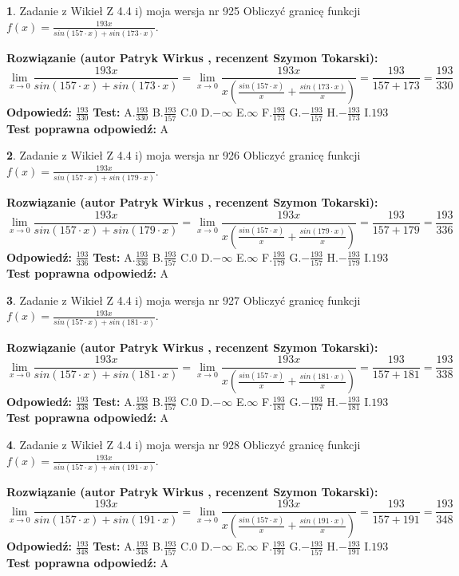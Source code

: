 \documentclass[12pt, a4paper]{article}
\theoremstyle{definition} %
\newtheorem{zad}{}
\newcommand{\zadStart}[1]{\begin{zad}#1\newline}
\newcommand{\zadStop}{\end{zad}}
\newcommand{\rozwStart}[2]{\noindent \textbf{Rozwiązanie (autor #1 , recenzent #2): }\newline}
\newcommand{\rozwStop}{\newline}
\newcommand{\odpStart}{\noindent \textbf{Odpowiedź:}\newline}
\newcommand{\odpStop}{\newline}
\newcommand{\testStart}{\noindent \textbf{Test:}\newline}
\newcommand{\testStop}{\newline}
\newcommand{\kluczStart}{\noindent \textbf{Test poprawna odpowiedź:}\newline}
\newcommand{\kluczStop}{\newline}
\begin{document}
\zadStart{Zadanie z Wikieł Z 4.4 i) moja wersja nr 925}
Obliczyć granicę funkcji $f(x)=\frac{193x}{sin(157\cdot x) +sin(173\cdot x)}$.
\zadStop
\rozwStart{Patryk Wirkus}{Szymon Tokarski}
$$\lim\limits_{x\to 0}\frac{193x}{sin(157\cdot x) +sin(173\cdot x)}=\lim\limits_{x\to 0}\frac{193x}{x(\frac{sin(157\cdot x)}{x}+\frac{sin(173\cdot x)}{x})}=\frac{193}{157+173} = \frac{193}{330}$$
\rozwStop
\odpStart
$\frac{193}{330}$
\odpStop
\testStart
A.$\frac{193}{330}$
B.$\frac{193}{157}$
C.$0$
D.$-\infty$
E.$\infty$
F.$\frac{193}{173}$
G.$-\frac{193}{157}$
H.$-\frac{193}{173}$
I.$193$
\testStop
\kluczStart
A
\kluczStop



\zadStart{Zadanie z Wikieł Z 4.4 i) moja wersja nr 926}
Obliczyć granicę funkcji $f(x)=\frac{193x}{sin(157\cdot x) +sin(179\cdot x)}$.
\zadStop
\rozwStart{Patryk Wirkus}{Szymon Tokarski}
$$\lim\limits_{x\to 0}\frac{193x}{sin(157\cdot x) +sin(179\cdot x)}=\lim\limits_{x\to 0}\frac{193x}{x(\frac{sin(157\cdot x)}{x}+\frac{sin(179\cdot x)}{x})}=\frac{193}{157+179} = \frac{193}{336}$$
\rozwStop
\odpStart
$\frac{193}{336}$
\odpStop
\testStart
A.$\frac{193}{336}$
B.$\frac{193}{157}$
C.$0$
D.$-\infty$
E.$\infty$
F.$\frac{193}{179}$
G.$-\frac{193}{157}$
H.$-\frac{193}{179}$
I.$193$
\testStop
\kluczStart
A
\kluczStop



\zadStart{Zadanie z Wikieł Z 4.4 i) moja wersja nr 927}
Obliczyć granicę funkcji $f(x)=\frac{193x}{sin(157\cdot x) +sin(181\cdot x)}$.
\zadStop
\rozwStart{Patryk Wirkus}{Szymon Tokarski}
$$\lim\limits_{x\to 0}\frac{193x}{sin(157\cdot x) +sin(181\cdot x)}=\lim\limits_{x\to 0}\frac{193x}{x(\frac{sin(157\cdot x)}{x}+\frac{sin(181\cdot x)}{x})}=\frac{193}{157+181} = \frac{193}{338}$$
\rozwStop
\odpStart
$\frac{193}{338}$
\odpStop
\testStart
A.$\frac{193}{338}$
B.$\frac{193}{157}$
C.$0$
D.$-\infty$
E.$\infty$
F.$\frac{193}{181}$
G.$-\frac{193}{157}$
H.$-\frac{193}{181}$
I.$193$
\testStop
\kluczStart
A
\kluczStop



\zadStart{Zadanie z Wikieł Z 4.4 i) moja wersja nr 928}
Obliczyć granicę funkcji $f(x)=\frac{193x}{sin(157\cdot x) +sin(191\cdot x)}$.
\zadStop
\rozwStart{Patryk Wirkus}{Szymon Tokarski}
$$\lim\limits_{x\to 0}\frac{193x}{sin(157\cdot x) +sin(191\cdot x)}=\lim\limits_{x\to 0}\frac{193x}{x(\frac{sin(157\cdot x)}{x}+\frac{sin(191\cdot x)}{x})}=\frac{193}{157+191} = \frac{193}{348}$$
\rozwStop
\odpStart
$\frac{193}{348}$
\odpStop
\testStart
A.$\frac{193}{348}$
B.$\frac{193}{157}$
C.$0$
D.$-\infty$
E.$\infty$
F.$\frac{193}{191}$
G.$-\frac{193}{157}$
H.$-\frac{193}{191}$
I.$193$
\testStop
\kluczStart
A
\kluczStop
\end{document}
